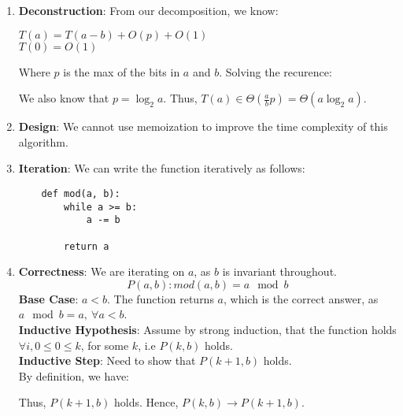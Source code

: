 \documentclass[a4paper]{article}
\begin{document}
\begin{enumerate}
\begin{enumerate}[label=\roman*]
\item \textbf{Deconstruction}: From our decomposition, we know:
\begin{center}
    $T(a) = T(a-b) + O(p) + O(1)$\\
    $T(0) = O(1)$
\end{center}
Where $p$ is the max of the bits in $a$ and $b$. Solving the recurence:
We also know that $p = \log_2 a$.
Thus, $T(a) \in \Theta(\frac{a}{b} p) = \Theta(a \log_2 a)$.\\

\item \textbf{Design}: We cannot use memoization to improve the time complexity of this algorithm.

\item \textbf{Iteration}: We can write the function iteratively as follows:
\begin{verbatim}
    def mod(a, b):
        while a >= b:
            a -= b

        return a
\end{verbatim}

\item \textbf{Correctness}: We are iterating on $a$, as $b$ is invariant throughout.
$$P(a, b): mod(a, b) = a \mod b$$
\textbf{Base Case}: $a < b$. The function returns $a$, which is the correct answer, as $a \mod b = a,\ \forall a < b$. \\
\textbf{Inductive Hypothesis}: Assume by strong induction, that the function holds $\forall i, 0 \leq 0 \leq k$, for some $k$, i.e $P(k, b)$ holds.\\
\textbf{Inductive Step}: Need to show that $P(k+1, b)$ holds.\\
By definition, we have:

Thus, $P(k+1, b)$ holds. Hence, $P(k, b) \rightarrow P(k+1, b)$.\\
\end{enumerate}
\vspace{1.5in}


\end{enumerate}
\end{document}
